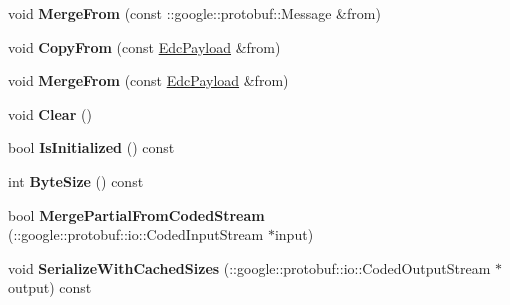 \begin{DoxyCompactItemize}
\item 
\hypertarget{classedcdatatypes_1_1_edc_payload_ac4c0ec9b1dfe5da88974e829df118f5e}{void {\bfseries Merge\-From} (const \-::google\-::protobuf\-::\-Message \&from)}\label{classedcdatatypes_1_1_edc_payload_ac4c0ec9b1dfe5da88974e829df118f5e}

\item 
\hypertarget{classedcdatatypes_1_1_edc_payload_a357b46be802584c794f695d0ffbfdfb1}{void {\bfseries Copy\-From} (const \hyperlink{classedcdatatypes_1_1_edc_payload}{Edc\-Payload} \&from)}\label{classedcdatatypes_1_1_edc_payload_a357b46be802584c794f695d0ffbfdfb1}

\item 
\hypertarget{classedcdatatypes_1_1_edc_payload_a68d6422daa6661b1c64550bb98aa57c9}{void {\bfseries Merge\-From} (const \hyperlink{classedcdatatypes_1_1_edc_payload}{Edc\-Payload} \&from)}\label{classedcdatatypes_1_1_edc_payload_a68d6422daa6661b1c64550bb98aa57c9}

\item 
\hypertarget{classedcdatatypes_1_1_edc_payload_a3b93145dad13232d40870528d0f29b05}{void {\bfseries Clear} ()}\label{classedcdatatypes_1_1_edc_payload_a3b93145dad13232d40870528d0f29b05}

\item 
\hypertarget{classedcdatatypes_1_1_edc_payload_a9b88cfada5d5c41a8299bac53d48712a}{bool {\bfseries Is\-Initialized} () const }\label{classedcdatatypes_1_1_edc_payload_a9b88cfada5d5c41a8299bac53d48712a}

\item 
\hypertarget{classedcdatatypes_1_1_edc_payload_afa2d0111f1984980d8cc189f18ca6fa8}{int {\bfseries Byte\-Size} () const }\label{classedcdatatypes_1_1_edc_payload_afa2d0111f1984980d8cc189f18ca6fa8}

\item 
\hypertarget{classedcdatatypes_1_1_edc_payload_a954480723b309401dd769c7aa96754a6}{bool {\bfseries Merge\-Partial\-From\-Coded\-Stream} (\-::google\-::protobuf\-::io\-::\-Coded\-Input\-Stream $\ast$input)}\label{classedcdatatypes_1_1_edc_payload_a954480723b309401dd769c7aa96754a6}

\item 
\hypertarget{classedcdatatypes_1_1_edc_payload_ac8d9816fc094e8bf788f06a88d52d42e}{void {\bfseries Serialize\-With\-Cached\-Sizes} (\-::google\-::protobuf\-::io\-::\-Coded\-Output\-Stream $\ast$output) const }\label{classedcdatatypes_1_1_edc_payload_ac8d9816fc094e8bf788f06a88d52d42e}


\end{DoxyCompactItemize}
